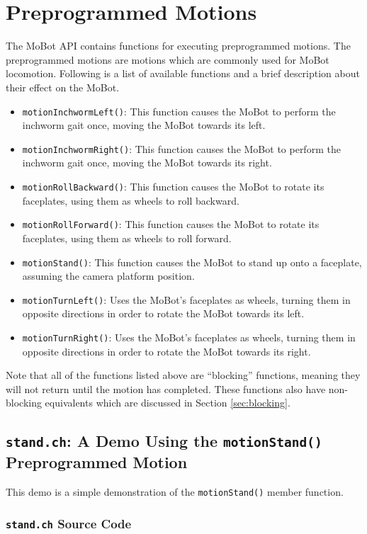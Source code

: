 \documentclass{article}
\begin{document}
\section{Preprogrammed Motions}
The MoBot API contains functions for executing preprogrammed motions. The 
preprogrammed motions are motions which are commonly used for MoBot locomotion.
Following is a list of available functions and a brief description about
their effect on the MoBot.
\begin{itemize}
\item \texttt{motionInchwormLeft()}: This function causes the MoBot to perform
  the inchworm gait once, moving the MoBot towards its left.
\item \texttt{motionInchwormRight()}: This function causes the MoBot to perform
  the inchworm gait once, moving the MoBot towards its right.
\item \texttt{motionRollBackward()}: This function causes the MoBot to rotate
  its faceplates, using them as wheels to roll backward.
\item \texttt{motionRollForward()}: This function causes the MoBot to rotate
  its faceplates, using them as wheels to roll forward.
\item \texttt{motionStand()}: This function causes the MoBot to stand up onto a 
  faceplate, assuming the camera platform position.
\item \texttt{motionTurnLeft()}: Uses the MoBot's faceplates as wheels, turning
  them in opposite directions in order to rotate the MoBot towards its left.
\item \texttt{motionTurnRight()}: Uses the MoBot's faceplates as wheels, turning
  them in opposite directions in order to rotate the MoBot towards its right.
\end{itemize}

Note that all of the functions listed above are ``blocking'' functions, meaning
they will not return until the motion has completed. These functions also
have non-blocking equivalents which are discussed in Section
\ref{sec:blocking}.

\subsection{\texttt{stand.ch}: A Demo Using the \texttt{motionStand()} Preprogrammed
Motion}
This demo is a simple demonstration of the \texttt{motionStand()} member function.
\subsubsection{\texttt{stand.ch} Source Code}

\end{document}
